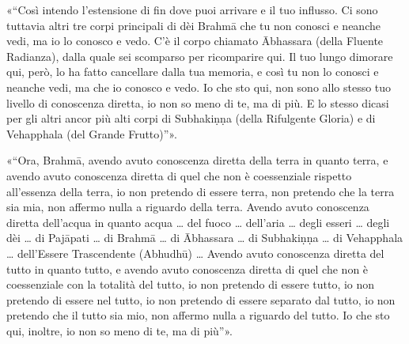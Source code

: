 «“Così intendo l’estensione di fin dove puoi arrivare e il tuo influsso. Ci sono
tuttavia altri tre corpi principali di dèi Brahmā che tu non conosci e neanche
vedi, ma io lo conosco e vedo. C’è il corpo chiamato Ābhassara (della Fluente
Radianza), dalla quale sei scomparso per ricomparire qui. Il tuo lungo dimorare
qui, però, lo ha fatto cancellare dalla tua memoria, e così tu non lo conosci e
neanche vedi, ma che io conosco e vedo. Io che sto qui, non sono allo stesso tuo
livello di conoscenza diretta, io non so meno di te, ma di più. E lo stesso
dicasi per gli altri ancor più alti corpi di Subhakiṇṇa (della Rifulgente
Gloria) e di Vehapphala (del Grande Frutto)”».

«“Ora, Brahmā, avendo avuto conoscenza diretta della terra in quanto terra, e
avendo avuto conoscenza diretta di quel che non è coessenziale rispetto
all’essenza della terra, io non pretendo di essere terra,
non pretendo che la terra sia mia, non affermo nulla a riguardo della terra.
Avendo avuto conoscenza diretta dell’acqua in quanto acqua … del fuoco …
dell’aria … degli esseri … degli dèi … di Pajāpati … di Brahmā … di Ābhassara …
di Subhakiṇṇa … di Vehapphala … dell’Essere Trascendente (Abhudhū) … Avendo
avuto conoscenza diretta del tutto in quanto tutto, e avendo avuto conoscenza
diretta di quel che non è coessenziale con la totalità del tutto, io non
pretendo di essere tutto, io non pretendo di essere nel tutto, io non pretendo
di essere separato dal tutto, io non pretendo che il tutto sia mio, non affermo
nulla a riguardo del tutto. Io che sto qui, inoltre, io non so meno di te, ma di
più”».

